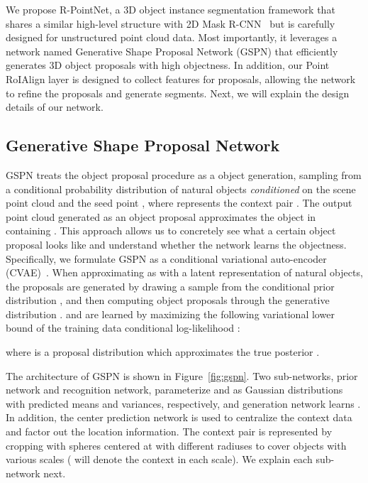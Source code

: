 \documentclass[10pt,twocolumn,letterpaper]{article}
\begin{document}
We propose R-PointNet, a 3D object instance segmentation framework that shares a similar high-level structure with 2D Mask R-CNN~\cite{he2017mask} but is carefully designed for unstructured point cloud data. Most importantly, it leverages a network named Generative Shape Proposal Network (GSPN) that efficiently generates 3D object proposals with high objectness. In addition, our Point RoIAlign layer is designed to collect features for proposals, allowing the network to refine the proposals and generate segments. Next, we will explain the design details of our network.



\subsection{Generative Shape Proposal Network}


GSPN treats the object proposal procedure as a object generation, sampling from a conditional probability distribution of natural objects  \emph{conditioned} on the scene point cloud  and the seed point , where  represents the context pair . The output point cloud  generated as an object proposal approximates the object  in  containing .
This approach allows us to concretely see what a certain object proposal looks like and understand whether the network learns the objectness.
Specifically, we formulate GSPN as a conditional variational auto-encoder (CVAE)~\cite{sohn2015learning}.
When approximating  as  with a latent representation  of natural objects, the proposals are generated by drawing a sample  from the conditional prior distribution , and then computing object proposals  through the generative distribution .  and  are learned by maximizing the following
variational lower bound of the training data conditional log-likelihood :


\noindent
where  is a proposal distribution which approximates the true posterior .

The architecture of GSPN is shown in Figure~\ref{fig:gspn}.
Two sub-networks, prior network and recognition network, parameterize  and  as Gaussian distributions with predicted means and variances, respectively, and generation network learns . In addition, the center prediction network is used to centralize the context data and factor out the location information.
The context pair  is represented by cropping  with spheres centered at  with  different radiuses to cover objects with various scales ( will denote the context in each scale).
We explain each sub-network next.
\end{document}
